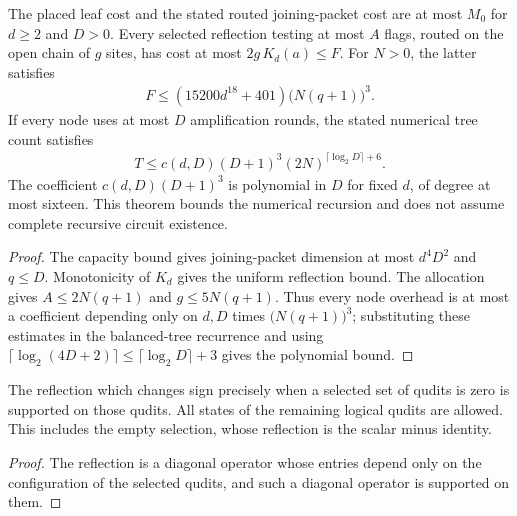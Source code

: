 \begin{lemma}
    \label{thm:mpu_uniform_numeric_resources}
    \leanok
    The placed leaf cost and the stated routed joining-packet cost
    are at most $M_0$ for $d\geq2$ and $D>0$. Every selected reflection
    testing at most $A$ flags, routed on the open chain of $g$ sites,
    has cost at most $2g\,K_d(a)\leq F$. For $N>0$, the latter satisfies
    \begin{align}
        F\leq(15200d^{18}+401)\bigl(N(q+1)\bigr)^3.
    \end{align}
    If every node uses at most $D$ amplification rounds, the stated
    numerical tree count satisfies
    \begin{align}
        T\leq c(d,D)(D+1)^3
        (2N)^{\lceil\log_2D\rceil+6}.
    \end{align}
    The coefficient $c(d,D)(D+1)^3$ is polynomial in $D$ for fixed
    $d$, of degree at most sixteen. This theorem bounds the numerical
    recursion and does not assume complete recursive circuit existence.
\end{lemma}
\begin{proof}\leanok
    The capacity bound gives joining-packet dimension at most $d^4D^2$
    and $q\leq D$. Monotonicity of $K_d$ gives the uniform reflection
    bound. The allocation gives $A\leq2N(q+1)$ and $g\leq5N(q+1)$.
    Thus every node overhead is at most a coefficient depending only
    on $d,D$ times $\bigl(N(q+1)\bigr)^3$; substituting these estimates
    in the balanced-tree recurrence and using
    $\lceil\log_2(4D+2)\rceil\leq\lceil\log_2D\rceil+3$ gives the polynomial bound.
\end{proof}

\begin{lemma}
    \label{thm:mpu_selected_reflection_support}
    \leanok
    The reflection which changes sign precisely when a selected set
    of qudits is zero is supported on those qudits. All states of
    the remaining logical qudits are allowed. This includes the empty
    selection, whose reflection is the scalar minus identity.
\end{lemma}
\begin{proof}\leanok
    The reflection is a diagonal operator whose entries depend only on
    the configuration of the selected qudits, and such a diagonal
    operator is supported on them.
\end{proof}

